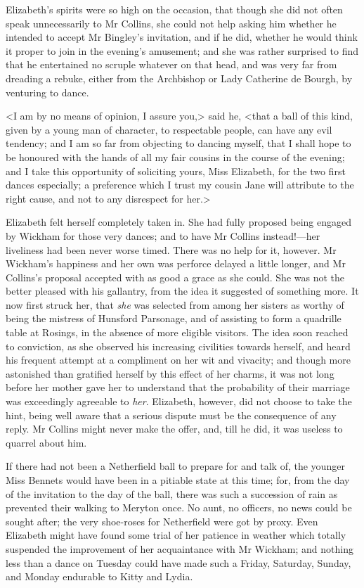 Elizabeth's spirits were so high on the occasion, that though she did not often speak unnecessarily to Mr Collins, she could not help asking him whether he intended to accept Mr Bingley's invitation, and if he did, whether he would think it proper to join in the evening's amusement; and she was rather surprised to find that he entertained no scruple whatever on that head, and was very far from dreading a rebuke, either from the Archbishop or Lady Catherine de Bourgh, by venturing to dance.

<I am by no means of opinion, I assure you,> said he, <that a ball of this kind, given by a young man of character, to respectable people, can have any evil tendency; and I am so far from objecting to dancing myself, that I shall hope to be honoured with the hands of all my fair cousins in the course of the evening; and I take this opportunity of soliciting yours, Miss Elizabeth, for the two first dances especially; a preference which I trust my cousin Jane will attribute to the right cause, and not to any disrespect for her.>

Elizabeth felt herself completely taken in. She had fully proposed being engaged by Wickham for those very dances; and to have Mr Collins instead!—her liveliness had been never worse timed. There was no help for it, however. Mr Wickham's happiness and her own was perforce delayed a little longer, and Mr Collins's proposal accepted with as good a grace as she could. She was not the better pleased with his gallantry, from the idea it suggested of something more. It now first struck her, that \textit{she} was selected from among her sisters as worthy of being the mistress of Hunsford Parsonage, and of assisting to form a quadrille table at Rosings, in the absence of more eligible visitors. The idea soon reached to conviction, as she observed his increasing civilities towards herself, and heard his frequent attempt at a compliment on her wit and vivacity; and though more astonished than gratified herself by this effect of her charms, it was not long before her mother gave her to understand that the probability of their marriage was exceedingly agreeable to \textit{her}. Elizabeth, however, did not choose to take the hint, being well aware that a serious dispute must be the consequence of any reply. Mr Collins might never make the offer, and, till he did, it was useless to quarrel about him.

If there had not been a Netherfield ball to prepare for and talk of, the younger Miss Bennets would have been in a pitiable state at this time; for, from the day of the invitation to the day of the ball, there was such a succession of rain as prevented their walking to Meryton once. No aunt, no officers, no news could be sought after; the very shoe-roses for Netherfield were got by proxy. Even Elizabeth might have found some trial of her patience in weather which totally suspended the improvement of her acquaintance with Mr Wickham; and nothing less than a dance on Tuesday could have made such a Friday, Saturday, Sunday, and Monday endurable to Kitty and Lydia.